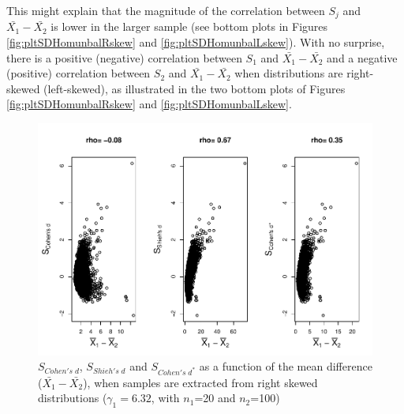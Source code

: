 \documentclass[
  english,
  man,mask]{apa6}
\begin{document}
This might explain that the magnitude of the correlation between \(S_j\) and \(\bar{X_1}-\bar{X_2}\) is lower in the larger sample (see bottom plots in Figures \ref{fig:pltSDHomunbalRskew} and \ref{fig:pltSDHomunbalLskew}). With no surprise, there is a positive (negative) correlation between \(S_1\) and \(\bar{X_1}-\bar{X_2}\) and a negative (positive) correlation between \(S_2\) and \(\bar{X_1}-\bar{X_2}\) when distributions are right-skewed (left-skewed), as illustrated in the two bottom plots of Figures \ref{fig:pltSDHomunbalRskew} and \ref{fig:pltSDHomunbalLskew}.

\begin{figure}
\centering
\includegraphics{Correlation_files/figure-latex/pltStdzrHomunbalRskew-1.pdf}
\caption{\label{fig:pltStdzrHomunbalRskew}\(S_{Cohen's \; d}\), \(S_{Shieh's \; d}\) and \(S_{Cohen's \; d^*}\) as a function of the mean difference (\(\bar{X_1}-\bar{X_2}\)), when samples are extracted from right skewed distributions (\(\gamma_1 = 6.32\), with \(n_1\)=20 and \(n_2\)=100)}
\end{figure}
\end{document}

